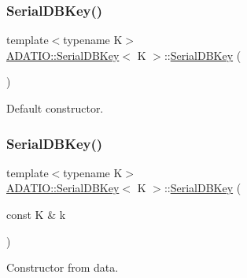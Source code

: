 \subsubsection{\texorpdfstring{SerialDBKey()}{SerialDBKey()}\hspace{0.1cm}{\footnotesize\ttfamily [1/4]}}
{\footnotesize\ttfamily template$<$typename K$>$ \\
\mbox{\hyperlink{classADATIO_1_1SerialDBKey}{A\+D\+A\+T\+I\+O\+::\+Serial\+D\+B\+Key}}$<$ K $>$\+::\mbox{\hyperlink{classADATIO_1_1SerialDBKey}{Serial\+D\+B\+Key}} (\begin{DoxyParamCaption}{ }\end{DoxyParamCaption})\hspace{0.3cm}{\ttfamily [inline]}}



Default constructor. 

\mbox{\label{classADATIO_1_1SerialDBKey_ad035f1ac5d8565aec4e5a7197333123f}} 
\subsubsection{\texorpdfstring{SerialDBKey()}{SerialDBKey()}\hspace{0.1cm}{\footnotesize\ttfamily [2/4]}}
{\footnotesize\ttfamily template$<$typename K$>$ \\
\mbox{\hyperlink{classADATIO_1_1SerialDBKey}{A\+D\+A\+T\+I\+O\+::\+Serial\+D\+B\+Key}}$<$ K $>$\+::\mbox{\hyperlink{classADATIO_1_1SerialDBKey}{Serial\+D\+B\+Key}} (\begin{DoxyParamCaption}\item[{const K \&}]{k }\end{DoxyParamCaption})\hspace{0.3cm}{\ttfamily [inline]}}



Constructor from data. 

\mbox{\label{classADATIO_1_1SerialDBKey_acaf28250dcc8a2b3944f7edef046df05}} 
